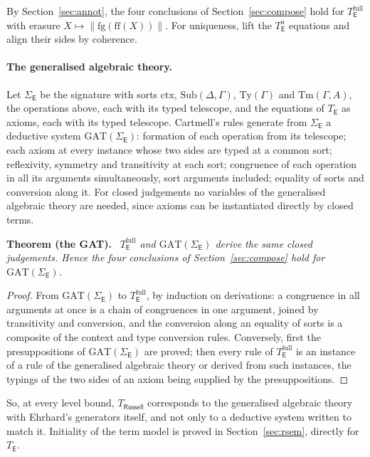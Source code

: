 \documentclass[11pt]{article}
\newenvironment{theorem}[1]{\par\medskip\noindent\textbf{Theorem #1.}\ \itshape}{\par\medskip}
\theoremstyle{definition}
\theoremstyle{remark}
\begin{document}
By Section~\ref{sec:annot}, the four conclusions of
Section~\ref{sec:compose} hold for $T_{\mathsf E}^{\mathrm{full}}$
with erasure \mbox{$X\mapsto\|\mathrm{fg}(\mathrm{ff}(X))\|$}.
For uniqueness, lift the $T_{\mathsf E}^{a}$ equations and align their
sides by coherence.

\paragraph{The generalised algebraic theory.} Let $\Sigma_{\mathsf E}$ be
the signature with sorts $\mathrm{ctx}$, $\mathrm{Sub}(\Delta,\Gamma)$,
$\mathrm{Ty}(\Gamma)$ and $\mathrm{Tm}(\Gamma,A)$, the operations above, each
with its typed telescope, and the equations of $T_{\mathsf E}$ as axioms,
each with its typed telescope. Cartmell's rules generate from
$\Sigma_{\mathsf E}$ a deductive system $\mathrm{GAT}(\Sigma_{\mathsf E})$:
formation of each operation from its telescope; each axiom at every
instance whose two sides are typed at a common sort; reflexivity,
symmetry and transitivity at each sort; congruence of each operation in
all its arguments simultaneously, sort arguments included; equality of
sorts and conversion along it. For closed judgements no variables of the
generalised algebraic theory are needed, since axioms can be instantiated
directly by closed terms.

\begin{theorem}{(the GAT)}
$T_{\mathsf E}^{\mathrm{full}}$ and $\mathrm{GAT}(\Sigma_{\mathsf E})$
derive the same closed judgements. Hence the four conclusions of
Section~\ref{sec:compose} hold for $\mathrm{GAT}(\Sigma_{\mathsf E})$.
\end{theorem}
\begin{proof}
From $\mathrm{GAT}(\Sigma_{\mathsf E})$ to $T_{\mathsf E}^{\mathrm{full}}$, by
induction on derivations: a congruence in all arguments at once is a
chain of congruences in one argument, joined by transitivity and
conversion, and the conversion along an equality of sorts is a
composite of the context and type conversion rules. Conversely, first
the presuppositions of $\mathrm{GAT}(\Sigma_{\mathsf E})$ are proved; then
every rule of $T_{\mathsf E}^{\mathrm{full}}$ is an instance of a rule of
the generalised algebraic theory or derived from such instances, the
typings of the two sides of an axiom being supplied by the
presuppositions.
\end{proof}
So, at every level bound, $T_{\mathsf{Russell}}$ corresponds to the
generalised algebraic theory with Ehrhard's generators itself, and not
only to a deductive system written to match it. Initiality of the term
model is proved in Section~\ref{sec:rsem}, directly for $T_{\mathsf E}$.
\end{document}
